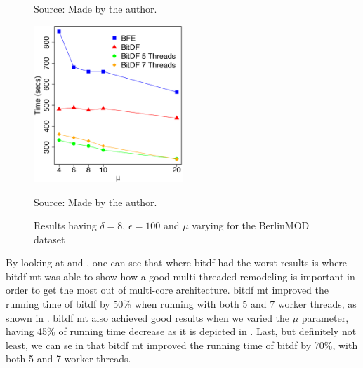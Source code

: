 {\begin{figure}[h!]
\begin{subfigure}[t]{0.49\textwidth}
        \label{fig:berlinmod_complete_vary_g}
    \end{subfigure}
    \footnotesize{Source: Made by the author.}
    \label{fig:berlinmod_complete_results}
\end{figure}

\begin{figure}[h!]
    \centering
    \caption{Results having $\delta = 8$, $\epsilon = 100$ and $\mu$ varying for the BerlinMOD dataset}
    \centerline{\includegraphics[width=0.5\textwidth]{images/BerlinMOD_complete_varying_n.eps}}
    \footnotesize{Source: Made by the author.}
    \label{fig:berlinmod_complete_vary_n}
\end{figure}

By looking at  and , one can see that where
\ac{bitdf} had the worst results is where \ac{bitdf} \ac{mt} was able to show how a good multi-threaded remodeling is
important in order to get the most out of multi-core architecture. \ac{bitdf} \ac{mt} improved the running time of
\ac{bitdf} by 50\% when running with both 5 and 7 worker threads, as shown in .
\ac{bitdf} \ac{mt} also achieved good results when we varied the $\mu$ parameter, having 45\% of running time decrease
as it is depicted in . Last, but definitely not least, we can se in
 that \ac{bitdf} \ac{mt} improved the running time of \ac{bitdf} by 70\%, with
both 5 and 7 worker threads.

}

